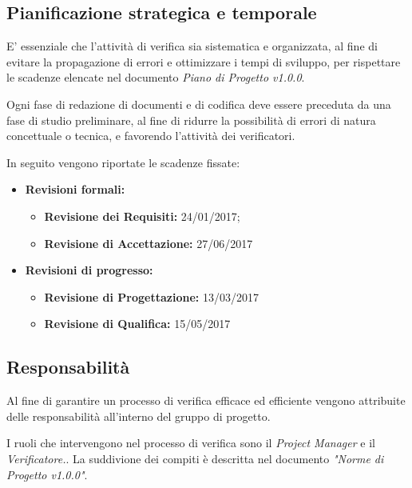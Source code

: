 \documentclass[12pt,a4paper,titlepage]{article}
\begin{document}
	\subsection{Pianificazione strategica e temporale}
	E' essenziale che l'attività di verifica sia sistematica e organizzata, al fine di evitare la propagazione di errori e ottimizzare i tempi di sviluppo, per rispettare le scadenze elencate nel documento \textit{Piano di Progetto v1.0.0}.
	
	Ogni fase di redazione di documenti e di codifica deve essere preceduta da una fase di studio preliminare, al fine di ridurre la possibilità di errori di natura concettuale o tecnica, e favorendo l'attività dei verificatori.
	
	In seguito vengono riportate le scadenze fissate:
	\begin{itemize}
		\item \textbf{Revisioni formali:}
			\begin{itemize}
				\item \textbf{Revisione dei Requisiti:} 24/01/2017;
				\item \textbf{Revisione di Accettazione:} 27/06/2017
			\end{itemize}
		\item \textbf{Revisioni di progresso:}
			\begin{itemize}
				\item \textbf{Revisione di Progettazione:} 13/03/2017
				\item \textbf{Revisione di Qualifica:} 15/05/2017
			\end{itemize}
	\end{itemize}
	\subsection{Responsabilità}
	Al fine di garantire un processo di verifica efficace ed efficiente vengono attribuite delle responsabilità all'interno del gruppo di progetto. 
	
	I ruoli che intervengono nel processo di verifica sono il \textit{Project Manager} e il \textit{Verificatore.}. La suddivione dei compiti è descritta nel documento \textit{"Norme di Progetto v1.0.0"}.
\end{document}

